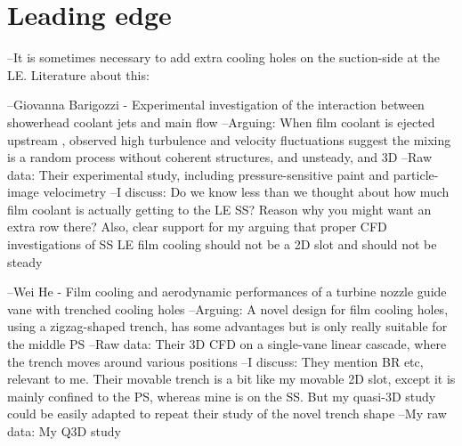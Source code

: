 \documentclass[11pt, twoside]{report}
\begin{document}
\chapter{Leading edge}




--It is sometimes necessary to add extra cooling holes on the suction-side at the LE. Literature about this:

	--Giovanna Barigozzi - Experimental investigation of the interaction between showerhead coolant jets and main flow
		--Arguing: When film coolant is ejected upstream , observed high turbulence and velocity fluctuations suggest the mixing is a random process without coherent structures, and unsteady, and 3D
		--Raw data: Their experimental study, including pressure-sensitive paint and particle-image velocimetry
		--I discuss: Do we know less than we thought about how much film coolant is actually getting to the LE SS? Reason why you might want an extra row there? Also, clear support for my arguing that proper CFD investigations of SS LE film cooling should not be a 2D slot and should not be steady
	
	--Wei He - Film cooling and aerodynamic performances of a turbine nozzle guide vane with trenched cooling holes
		--Arguing: A novel design for film cooling holes, using a zigzag-shaped trench, has some advantages but is only really suitable for the middle PS
		--Raw data: Their 3D CFD on a single-vane linear cascade, where the trench moves around various positions
		--I discuss: They mention BR etc, relevant to me. Their movable trench is a bit like my movable 2D slot, except it is mainly confined to the PS, whereas mine is on the SS. But my quasi-3D study could be easily adapted to repeat their study of the novel trench shape
		--My raw data: My Q3D study
		
\end{document}
